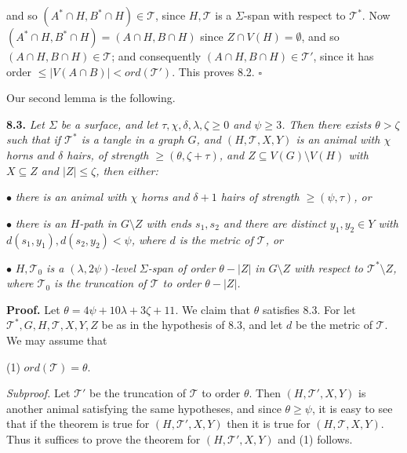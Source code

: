 \noindent and so $(A^* \cap H, B^* \cap H) \in \mathcal{T}$, since $H, \mathcal{T}$ is a $\Sigma$-span with respect to $\mathcal{T}^*$. Now $(A^* \cap H, B^* \cap H) = (A \cap H, B \cap H)$ since $Z \cap V(H) = \emptyset$, and so $(A \cap H, B \cap H) \in \mathcal{T}$; and consequently $(A \cap H, B \cap H) \in \mathcal{T}'$, since it has order $\le |V(A \cap B)| < ord(\mathcal{T}')$. This proves 8.2. $\square$

Our second lemma is the following.

\textbf{8.3.} \textit{Let $\Sigma$ be a surface, and let $\tau, \chi, \delta, \lambda, \zeta \ge 0$ and $\psi \ge 3$. Then there exists $\theta > \zeta$ such that if $\mathcal{T}^*$ is a tangle in a graph $G$, and $(H, \mathcal{T}, X, Y)$ is an animal with $\chi$ horns and $\delta$ hairs, of strength $\ge (\theta, \zeta + \tau)$, and $Z \subseteq V(G) \setminus V(H)$ with $X \subseteq Z$ and $|Z| \le \zeta$, then either:}

\hspace*{12pt}$\bullet$ \textit{there is an animal with $\chi$ horns and $\delta + 1$ hairs of strength $\ge (\psi, \tau)$, or}

\hspace*{12pt}$\bullet$ \textit{there is an $H$-path in $G \setminus Z$ with ends $s_1, s_2$ and there are distinct $y_1, y_2 \in Y$ with $d(s_1, y_1), d(s_2, y_2) < \psi$, where $d$ is the metric of $\mathcal{T}$, or}

\hspace*{12pt}$\bullet$ \textit{$H, \mathcal{T}_0$ is a $(\lambda, 2\psi)$-level $\Sigma$-span of order $\theta - |Z|$ in $G \setminus Z$ with respect to $\mathcal{T}^* \setminus Z$, where $\mathcal{T}_0$ is the truncation of $\mathcal{T}$ to order $\theta - |Z|$.}

\textbf{Proof.} Let $\theta = 4\psi + 10\lambda + 3\zeta + 11$. We claim that $\theta$ satisfies 8.3. For let $\mathcal{T}^*, G, H, \mathcal{T}, X, Y, Z$ be as in the hypothesis of 8.3, and let $d$ be the metric of $\mathcal{T}$. We may assume that

\hspace*{12pt}(1) $ord(\mathcal{T}) = \theta$.

\textit{Subproof.} Let $\mathcal{T}'$ be the truncation of $\mathcal{T}$ to order $\theta$. Then $(H, \mathcal{T}', X, Y)$ is another animal satisfying the same hypotheses, and since $\theta \ge \psi$, it is easy to see that if the theorem is true for $(H, \mathcal{T}', X, Y)$ then it is true for $(H, \mathcal{T}, X, Y)$. Thus it suffices to prove the theorem for $(H, \mathcal{T}', X, Y)$ and (1) follows.

